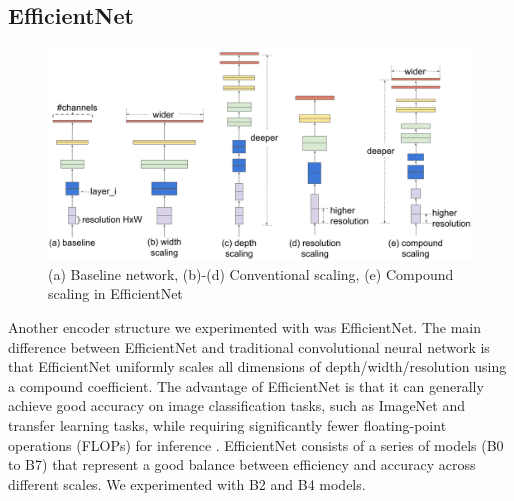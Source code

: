 \documentclass[10pt,twocolumn,letterpaper]{article}
\begin{document}
\subsection{EfficientNet}
\begin{figure}[t]
  \centering
   \includegraphics[width=0.8\linewidth]{final-report/figures/effnet.png}
   \caption{(a) Baseline network, (b)-(d) Conventional scaling, (e) Compound scaling in EfficientNet}
   \label{fig:effnet}
\end{figure}


Another encoder structure we experimented with was EfficientNet. The main difference between EfficientNet and traditional convolutional neural network is that EfficientNet uniformly scales all dimensions of depth/width/resolution using a compound coefficient. The advantage of EfficientNet is that it can generally achieve good accuracy on image classification tasks, such as ImageNet and transfer learning tasks, while requiring significantly fewer floating-point operations (FLOPs) for inference \cite{Keras_EfficientNet}. EfficientNet consists of a series of models (B0 to B7) that represent a good balance between efficiency and accuracy across different scales. We experimented with B2 and B4 models.



\end{document}
